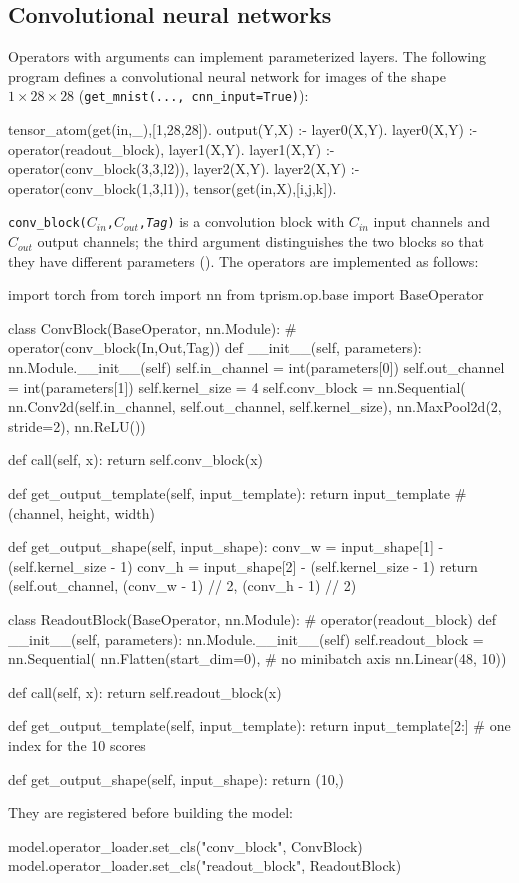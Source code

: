 \documentclass[a4paper]{report}
\begin{document}
\subsection*{Convolutional neural networks}
Operators with arguments can implement parameterized layers.  The
following program defines a convolutional neural network for images of
the shape $1\times 28\times 28$ ({\tt get\_mnist(..., cnn\_input=True)}):
\begin{prologcode}
tensor_atom(get(in,_),[1,28,28]).
output(Y,X) :- layer0(X,Y).
layer0(X,Y) :- operator(readout_block), layer1(X,Y).
layer1(X,Y) :- operator(conv_block(3,3,l2)), layer2(X,Y).
layer2(X,Y) :- operator(conv_block(1,3,l1)), tensor(get(in,X),[i,j,k]).
\end{prologcode}
{\tt conv\_block($C_{in}$,$C_{out}$,{\it Tag})} is a convolution block with
$C_{in}$ input channels and $C_{out}$ output channels; the third argument
distinguishes the two blocks so that they have different parameters
().  The operators are implemented as follows:
\begin{pythoncode}
import torch
from torch import nn
from tprism.op.base import BaseOperator

class ConvBlock(BaseOperator, nn.Module):      # operator(conv_block(In,Out,Tag))
    def __init__(self, parameters):
        nn.Module.__init__(self)
        self.in_channel = int(parameters[0])
        self.out_channel = int(parameters[1])
        self.kernel_size = 4
        self.conv_block = nn.Sequential(
            nn.Conv2d(self.in_channel, self.out_channel, self.kernel_size),
            nn.MaxPool2d(2, stride=2),
            nn.ReLU())

    def call(self, x):
        return self.conv_block(x)

    def get_output_template(self, input_template):
        return input_template          # (channel, height, width)

    def get_output_shape(self, input_shape):
        conv_w = input_shape[1] - (self.kernel_size - 1)
        conv_h = input_shape[2] - (self.kernel_size - 1)
        return (self.out_channel, (conv_w - 1) // 2, (conv_h - 1) // 2)

class ReadoutBlock(BaseOperator, nn.Module):   # operator(readout_block)
    def __init__(self, parameters):
        nn.Module.__init__(self)
        self.readout_block = nn.Sequential(
            nn.Flatten(start_dim=0),   # no minibatch axis
            nn.Linear(48, 10))

    def call(self, x):
        return self.readout_block(x)

    def get_output_template(self, input_template):
        return input_template[2:]      # one index for the 10 scores

    def get_output_shape(self, input_shape):
        return (10,)
\end{pythoncode}
They are registered before building the model:
\begin{pythoncode}
model.operator_loader.set_cls("conv_block", ConvBlock)
model.operator_loader.set_cls("readout_block", ReadoutBlock)
\end{pythoncode}
\end{document}
